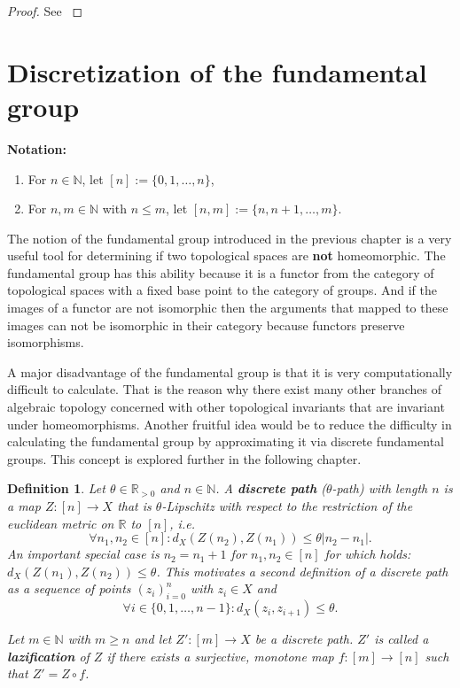 \documentclass[a4paper, 11pt, twoside]{article}
\newcommand{\R}[0]{\mathbb{R}}
\newcommand{\N}[0]{\mathbb{N}}
\theoremstyle{break}
\theoremstyle{break}
\newtheorem{defin}[thm]{Definition}
\begin{document}
\begin{proof}
  See \cite[p. 175f.]{munkres2000topology}
\end{proof}

\section{Discretization of the fundamental group}
\textbf{Notation:}
\begin{enumerate}
  \item For $n \in \N$, let $[n] := \{0, 1, \ldots, n\}$,
  \item For $n,m \in \N$ with $n \leq m$, let $[n,m] := \{n, n+1, \ldots, m\}$.
\end{enumerate}

The notion of the fundamental group introduced in the previous chapter is a very useful tool for determining if two topological spaces are \textbf{not} homeomorphic.
The fundamental group has this ability because it is a functor from the category of topological spaces with a fixed base point to the category of groups. 
And if the images of a functor are not isomorphic then the arguments that mapped to these images can not be isomorphic in their category because functors preserve isomorphisms.

A major disadvantage of the fundamental group is that it is very computationally difficult to calculate.
That is the reason why there exist many other branches of algebraic topology concerned with other topological invariants that are invariant under homeomorphisms. 
Another fruitful idea would be to reduce the difficulty in calculating the fundamental group by approximating it via discrete fundamental groups. 
This concept is explored further in the following chapter.

\begin{defin} \label{def:discrete-path}
  Let $\theta \in \R_{>0}$ and $n \in \N$. A \textbf{discrete path} ($\theta$-path) with length $n$ is a map $Z: [n] \to X$ that is $\theta$-Lipschitz with respect to the restriction of the euclidean metric on $\R$ to $[n]$, i.e.
  \begin{equation}
    \forall n_1, n_2 \in [n]\colon d_X(Z(n_2), Z(n_1)) \leq \theta |n_2 - n_1|.
  \end{equation}
  An important special case is $n_2 = n_1 + 1$ for $n_1, n_2 \in [n]$ for which holds: $d_X(Z(n_1), Z(n_2)) \leq \theta$. This motivates a second
  definition of a discrete path as a sequence of points $(z_i)_{i=0}^n$ with $z_i \in X$ and
  \begin{equation}
    \forall i \in \{0, 1, \ldots, n-1\} \colon d_X(z_i, z_{i+1}) \leq \theta.
  \end{equation}

  Let $m \in \N$ with $m \geq n$ and let $Z'\colon [m] \to X$ be a discrete path. $Z'$ is called a \textbf{lazification} of $Z$ if there exists a surjective, monotone map 
  $f\colon [m] \to [n]$ such that $Z' = Z \circ f$. 
  
  \cite[p. 3]{vigolo2018fundamental}
\end{defin}
\end{document}
